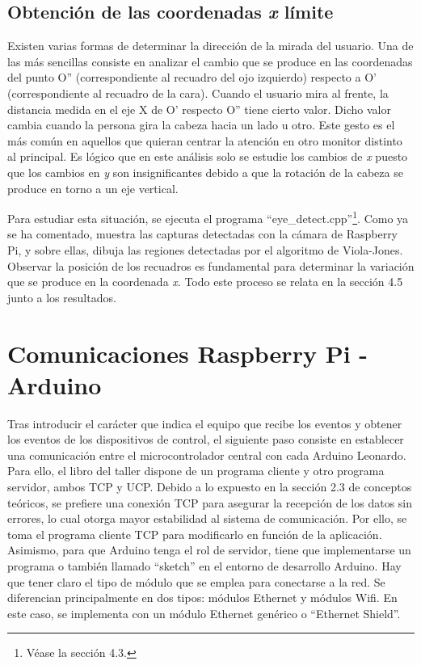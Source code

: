 \subsection{Obtención de las coordenadas {\itshape x} límite} \label{s3_4_2}

Existen varias formas de determinar la dirección de la mirada del usuario. Una de las más sencillas consiste en analizar el cambio que se produce en las coordenadas del punto O'' (correspondiente al recuadro del ojo izquierdo) respecto a O' (correspondiente al recuadro de la cara). Cuando el usuario mira al frente, la distancia medida en el eje X de O' respecto O'' tiene cierto valor. Dicho valor cambia cuando la persona gira la cabeza hacia un lado u otro. Este gesto es el más común en aquellos que quieran centrar la atención en otro monitor distinto al principal. Es lógico que en este análisis solo se estudie los cambios de {\itshape x} puesto que los cambios en {\itshape y} son insignificantes debido a que la rotación de la cabeza se produce en torno a un eje vertical.

Para estudiar esta situación, se ejecuta el programa ``eye\_detect.cpp''\footnote{Véase la sección 4.3.}. Como ya se ha comentado, muestra las capturas detectadas con la cámara de Raspberry Pi, y sobre ellas, dibuja las regiones detectadas por el algoritmo de Viola-Jones. Observar la posición de los recuadros es fundamental para determinar la variación que se produce en la coordenada {\itshape x}. Todo este proceso se relata en la sección 4.5 junto a los resultados.


\section{Comunicaciones Raspberry Pi - Arduino} \label{s3_5}

Tras introducir el carácter que indica el equipo que recibe los eventos y obtener los eventos de los dispositivos de control, el siguiente paso consiste en establecer una comunicación entre el microcontrolador central con cada Arduino Leonardo. Para ello, el libro del taller dispone de un programa cliente y otro programa servidor, ambos TCP y UCP. Debido a lo expuesto en la sección 2.3 de conceptos teóricos, se prefiere una conexión TCP para asegurar la recepción de los datos sin errores, lo cual otorga mayor estabilidad al sistema de comunicación. Por ello, se toma el programa cliente TCP para modificarlo en función de la aplicación. Asimismo, para que Arduino tenga el rol de servidor, tiene que implementarse un programa o también llamado ``sketch'' en el entorno de desarrollo Arduino. Hay que tener claro el tipo de módulo que se emplea para conectarse a la red. Se diferencian principalmente en dos tipos: módulos Ethernet y módulos Wifi. En este caso, se implementa con un módulo Ethernet genérico o ``Ethernet Shield''.


